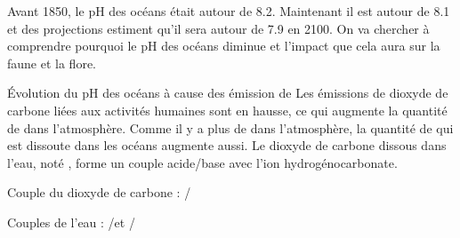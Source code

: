 

\medskip
Avant 1850, le pH des océans était autour de \num{8,2}.
Maintenant il est autour de \num{8,1} et des projections estiment qu'il sera autour de \num{7,9} en 2100.
On va chercher à comprendre pourquoi le pH des océans diminue et l'impact que cela aura sur la faune et la flore.



\begin{doc}{Évolution du pH des océans à cause des émission de }
Les émissions de dioxyde de carbone  liées aux activités humaines sont en hausse, ce qui augmente la quantité de  dans l'atmosphère.
Comme il y a plus de  dans l'atmosphère, la quantité de  qui est dissoute dans les océans augmente aussi.
Le dioxyde de carbone dissous dans l'eau, noté , forme un couple acide/base avec l'ion hydrogénocarbonate.
\end{doc}

\begin{donnees}[2]
  \item Couple du dioxyde de carbone : /
  \item Couples de l'eau : \oxonium/\eau et \eau/\hydroxyde
\end{donnees} 
\vspace*{-12pt}




